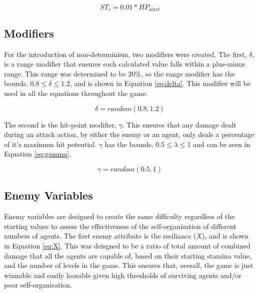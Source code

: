 \begin{equation}
    ST_c = 0.01*HP_{start}
\end{equation}


\subsection{Modifiers}\label{sec: modifiers}


For the introduction of non-determinism, two modifiers were created. The first, $\delta$, is a range modifier that ensures each calculated value falls within a plus-minus range. This range was determined to be $20\%$, so the range modifier has the bounds, $0.8 \leq \delta \leq 1.2 $, and is shown in Equation \ref{eq:delta}. This modifier will be used in all the equations throughout the game. 

\begin{equation}\label{eq:delta}
    \delta = random(0.8,1.2)
\end{equation}

The second is the hit-point modifier, $\gamma$. This ensures that any damage dealt during an attack action, by either the enemy or an agent, only deals a percentage of it's maximum hit potential. $\gamma$ has the bounds, $0.5 \leq \lambda \leq 1$ and can be seen in Equation \ref{eq:gamma}. 

\begin{equation}\label{eq:gamma}
    \gamma = random(0.5,1)
\end{equation}


\subsection{Enemy Variables}\label{sec: enemy}


Enemy variables are designed to create the same difficulty regardless of the starting values to assess the effectiveness of the self-organisation of different numbers of agents. The first enemy attribute is the resiliance ($X$), and is shown in Equation \ref{eq:X}. This was deisgned to be a ratio of total amount of combined damage that all the agents are capable of, based on their starting stamina value, and the number of levels in the game. This ensures that, overall, the game is just winnable and easily loosable given high thresholds of surviving agents and/or poor self-organisation. 

